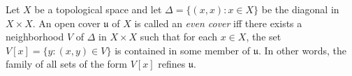 Let $X$ be a topological space and let $\Delta = \{(x, x) : x \in X\}$ be the diagonal in $X \times X$. An open cover $\mathfrak{u}$ of $X$ is called an \emph{even cover} iff there exists a neighborhood $V$ of $\Delta$ in $X \times X$ such that for each $x \in X$, the set $V[x] = \{y : (x, y) \in V\}$ is contained in some member of $\mathfrak{u}$. In other words, the family of all sets of the form $V[x]$ refines $\mathfrak{u}$.
